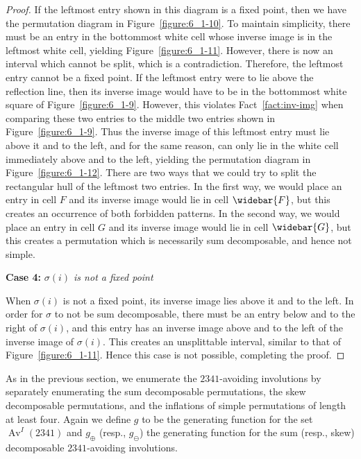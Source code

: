 \documentclass[10pt]{article}
\theoremstyle{plain}
\newcommand{\Av}{\operatorname{Av}}
\begin{document}
\begin{proof}
	 
	
	If the leftmost entry shown in this diagram is a fixed point, then we have the permutation diagram in Figure~\ref{figure:6_1-10}. To maintain simplicity, there must be an entry in the bottommost white cell whose inverse image is in the leftmost white cell, yielding Figure~\ref{figure:6_1-11}. However, there is now an interval which cannot be split, which is a contradiction. Therefore, the leftmost entry cannot be a fixed point. If the leftmost entry were to lie above the reflection line, then its inverse image would have to be in the bottommost white square of Figure~\ref{figure:6_1-9}. However, this violates Fact~\ref{fact:inv-img} when comparing these two entries to the middle two entries shown in Figure~\ref{figure:6_1-9}. Thus the inverse image of this leftmost entry must lie above it and to the left, and for the same reason, can only lie in the white cell immediately above and to the left, yielding the permutation diagram in Figure~\ref{figure:6_1-12}. There are two ways that we could try to split the rectangular hull of the leftmost two entries. In the first way, we would place an entry in cell $F$ and its inverse image would lie in cell $\widebar{F}$, but this creates an occurrence of both forbidden patterns. In the second way, we would place an entry in cell $G$ and its inverse image would lie in cell $\widebar{G}$, but this creates a permutation which is necessarily sum decomposable, and hence not simple.
	
	\textbf{Case 4:} \emph{$\sigma(i)$ is not a fixed point}
	
	When $\sigma(i)$ is not a fixed point, its inverse image lies above it and to the left. In order for $\sigma$ to not be sum decomposable, there must be an entry below and to the right of $\sigma(i)$, and this entry has an inverse image above and to the left of the inverse image of $\sigma(i)$.  This creates an unsplittable interval, similar to that of Figure~\ref{figure:6_1-11}. Hence this case is not possible, completing the proof.		
\end{proof}



As in the previous section, we enumerate the $2341$-avoiding involutions by separately enumerating the sum decomposable permutations, the skew decomposable permutations, and the inflations of simple permutations of length at least four. Again we define $g$ to be the generating function for the set $\Av^I(2341)$ and $g_\oplus$ (resp., $g_\ominus$) the generating function for the sum (resp., skew) decomposable $2341$-avoiding involutions.
\end{document}
